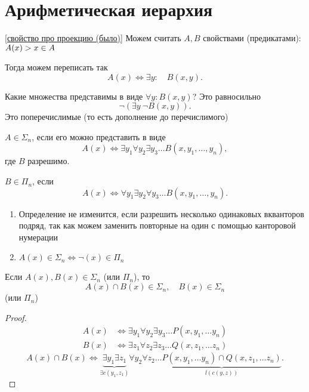 \section{Арифметическая иерархия}

\ref{свойство про проекцию (было)}
Можем считать $ A, B$ свойствами (предикатами):  $ A(x) \-> x \in A$

Тогда можем переписать так
\[
    A(x) \Longleftrightarrow \exists y \colon\quad B(x, y)
.\] 

Какие множества представимы в виде $ \forall y \colon B(x, y)$? Это равносильно
\[
    \neg \left( \exists  y ~ \neg B(x, y) \right) 
.\] 
Это поперечислимые (то есть дополнение до перечислимого)

\begin{defn}
    $ A \in \Sigma_{n} $, если его можно представить в виде 
    \[
	A(x) \Longleftrightarrow \exists y_1 \forall y_2 \exists y_3 \ldots B(x, y_1, \ldots , y_{n})
    ,\] 
    где $ B$ разрешимо.

     $ B \in \Pi_{n}$, если
     \[
	 A(x) \Longleftrightarrow \forall y_1 \exists y_2 \forall y_3 \ldots B(x, y_1, \ldots , y_{n})
     .\] 
\end{defn}
\begin{prop}
    \begin{enumerate}
        \item Определение не изменится, если разрешить несколько одинаковых вкванторов подряд, так как можем заменить повторные на один с помощью канторовой нумерации
	\item $ A(x) \in  \Sigma _{n} \Longleftrightarrow \neg (x) \in \Pi_{n}$
    \end{enumerate}
\end{prop}

\begin{thm}
    Если $ A(x), B(x) \in \Sigma _n $ (или $ \Pi_n$), то
     \[
	 A(x) \cap B(x) \in \Sigma_n , \quad B(x) \in \Sigma_n
    \] 
    (или $ \Pi_n$)
\end{thm}
\begin{proof}
    \begin{align*}
	A(x) & \Longleftrightarrow \exists y_1 \forall y_2 \exists y_3 \ldots P(x, y_1, \ldots y_{n}) \\
	B(x) & \Longleftrightarrow \exists z_1 \forall z_2 \exists z_3 \ldots Q(x, z_1, \ldots z_{n}) 
    \end{align*}
    \[
	A(x) \cap B(x) \Longleftrightarrow \underbrace{\exists y_1 \exists z_1}_{\exists c(y_1, z_1)} \forall y_2 \forall z_2 \ldots \underbrace{P(x, y_1, \ldots y_{n}) \cap Q(x, z_1, \ldots z_n)}_{l(c(y, z))}
    .\] 
\end{proof}

